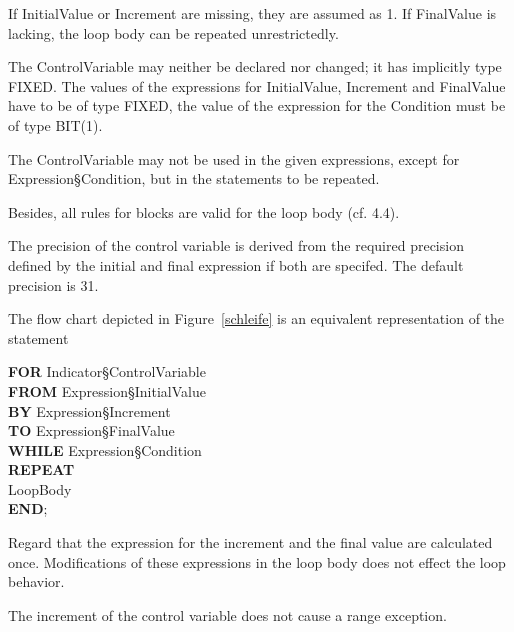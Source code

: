 If InitialValue or Increment are missing, they are assumed as 1. If FinalValue is lacking, the loop body can be repeated unrestrictedly.

The ControlVariable may neither be declared nor changed; it has
implicitly type FIXED. The values of the expressions for InitialValue,
Increment and FinalValue have to be of type FIXED, the value of the
expression for the Condition must be of type BIT(1).

The ControlVariable may not be used in the given expressions, except
for Expression\S Condition, but in the statements to be repeated.

Besides, all rules for blocks are valid for the loop body (cf. 4.4).

\begin{added}
The precision of the control variable is derived from the
required precision defined by the initial and final expression if both are
specifed.
The default precision is 31.
\end{added}

The flow chart depicted in Figure~\ref{schleife} is an equivalent representation of the
statement

{\bf FOR} Indicator\S ControlVariable \\
{\bf FROM} Expression\S InitialValue \\
{\bf BY} Expression\S Increment \\
{\bf TO} Expression\S FinalValue \\
{\bf WHILE} Expression\S Condition \\
{\bf REPEAT} \\
\x LoopBody \\
{\bf END};

\begin{added}
Regard that the expression for the increment and the final
value are calculated once. Modifications of these expressions
in the loop body does not effect the loop behavior.

The increment of the control variable does not cause
a range exception.
\end{added}

